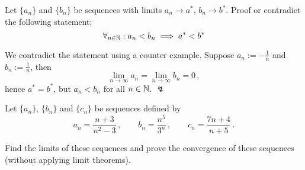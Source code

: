 \documentclass[week=2]{homework}
\begin{document}
\begin{questions}
	    \question
	    Let $\{a_n\}$ and $\{b_n\}$ be sequences with limits $a_n \to a^*$, $b_n \to b^*$.
	    Proof or contradict the following statement;
	    \[
		    \forall_{n \in \mathbb{N}}: a_n < b_n \implies a^* < b^*
	    \]
	    
	    We contradict the statement using a counter example. Suppose $a_n := -\frac{1}{n}$ and $b_n := \frac{1}{n}$, then
	    \[
		    \lim_{n\to\infty} a_n = \lim_{n\to\infty} b_n = 0\,,
	    \]
	    hence $a^* = b^*$, but $a_n < b_n$ for all $n \in \mathbb{N}$. $\lightning$
	    
	    \question
	    Let $\{a_n\}$, $\{b_n\}$ and $\{c_n\}$ be sequences defined by
	    \[
		    a_n = \frac{n+3}{n^2-3}\,,\qquad b_n = \frac{n^5}{3^n}\,,\qquad c_n = \frac{7n+4}{n+5}\,.
	    \]
	    
	    Find the limits of these sequences and prove the convergence of these sequences (without applying limit theorems).
	    \begin{parts}
	    	\part
	    	
	    	\part 
	    	
	    	\part
	    \end{parts}
     \end{questions}
\end{document}
